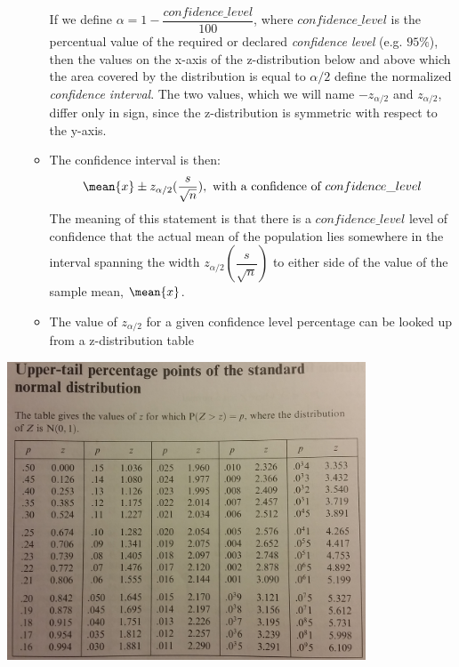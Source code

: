 \begin{itemize}
\begin{itemize}
    If we define $\alpha = 1-\dfrac{confidence\_level}{100}$, where $confidence\_level$ is the percentual value of the required or declared \emph{confidence level} (e.g. $95\%$), then the values on the x-axis of the z-distribution below and above which the area covered by the distribution is equal to $\alpha/2$ define the normalized \emph{confidence interval}. The two values, which we will name $-z_{\alpha/2}$ and $z_{\alpha/2}$, differ only in sign, since the z-distribution is symmetric with respect to the y-axis.
  \item The confidence interval is then: 
    $$\mean{x}\pm z_{\alpha/2}(\dfrac{s}{\sqrt{n}}), \text{ with a confidence of } confidence\_level$$
    The meaning of this statement is that there is a $confidence\_level$ level of confidence that the actual mean of the population lies somewhere in the interval spanning the width $z_{\alpha/2}(\dfrac{s}{\sqrt{n}})$ to either side of the value of the sample mean, $\mean{x}$.
    \item The value of $z_{\alpha/2}$ for a given confidence level percentage can be looked up from a z-distribution table
  \end{itemize}
\end{itemize}
\newpage
\includegraphics[width=0.8\textwidth]{1_1_8_z_distrib_pp.png}

\newpage



